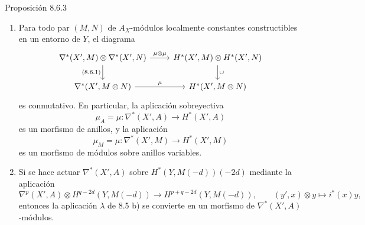 \begin{statement}{Proposición 8.6.3}
\begin{enumerate}[label=\alph*)]
\item Para todo par $(M,N)$ de $A_X$-módulos localmente constantes constructibles en un entorno de $Y$, el diagrama
\[
\begin{tikzcd}
\nabla^*(X',M)\otimes\nabla^*(X',N)\arrow[r,"\mu\otimes\mu"]\arrow[d,"{(8.6.1)}"']&
H^*(X',M)\otimes H^*(X',N)\arrow[d,"\cup"]\\
\nabla^*(X',M\otimes N)\arrow[r,"\mu"]&
H^*(X',M\otimes N)
\end{tikzcd}
\]
es conmutativo. En particular, la aplicación sobreyectiva
\[
\mu_A=\mu:\nabla^*(X',A)\to H^*(X',A)
\]
es un morfismo de anillos, y la aplicación
\[
\mu_M=\mu:\nabla^*(X',M)\to H^*(X',M)
\]
es un morfismo de módulos sobre anillos variables.
\item Si se hace actuar $\nabla^*(X',A)$ sobre $H^*(Y,M(-d))(-2d)$ mediante la aplicación
\[
\nabla^p(X',A)\otimes H^{q-2d}(Y,M(-d))
\to H^{p+q-2d}(Y,M(-d)),
\qquad
(y',x)\otimes y\mapsto i^*(x)y,
\]
entonces la aplicación $\lambda$ de 8.5 b) se convierte en un morfismo de $\nabla^*(X',A)$-módulos.
\end{enumerate}
\end{statement}
